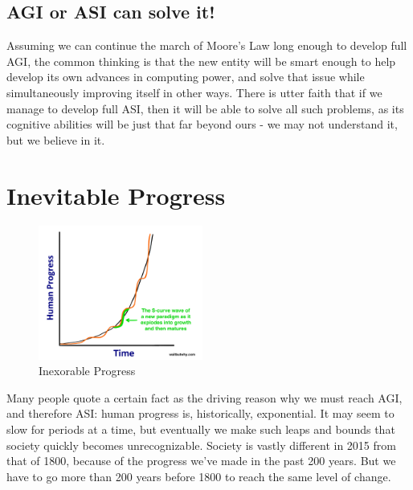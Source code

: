 \documentclass[12pt]{article} %
\begin{document}

\subsection{AGI or ASI can solve it!} %

Assuming we can continue the march of Moore's Law long enough to develop full AGI, the common thinking is that the new entity will be smart enough to help develop its own advances in computing power\cite{wbw}, and solve that issue while simultaneously improving itself in other ways. There is utter faith that if we manage to develop full ASI, then it will be able to solve all such problems, as its cognitive abilities will be just that far beyond ours - we may not understand it, but we believe in it.


\section{Inevitable Progress} %

\begin{figure}
  \begin{center}
    \includegraphics[width=0.48\textwidth]{curvyexponential.png}
  \end{center}
  \caption{Inexorable Progress}
\end{figure}

Many people quote a certain fact as the driving reason why we must reach AGI, and therefore ASI: human progress is, historically, exponential\cite{wbw}. It may seem to slow for periods at a time, but eventually we make such leaps and bounds that society quickly becomes unrecognizable. Society is vastly different in 2015 from that of 1800, because of the progress we've made in the past 200 years. But we have to go more than 200 years before 1800 to reach the same level of change.
\end{document}
